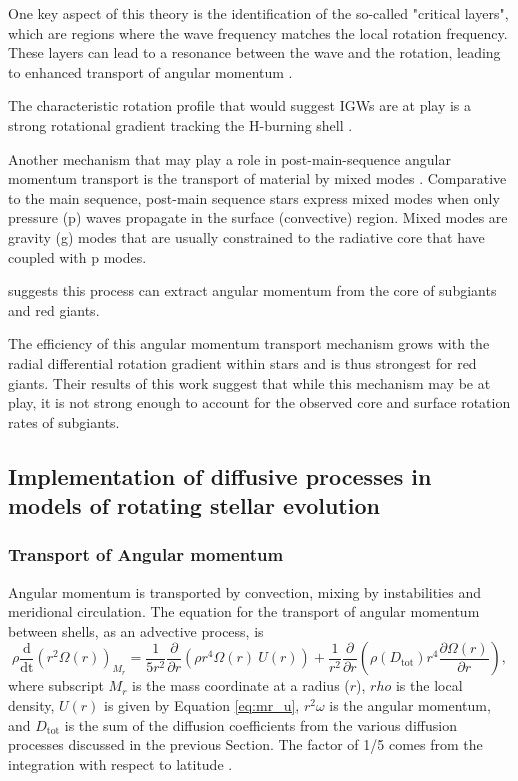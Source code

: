 One key aspect of this theory is the identification of the so-called "critical layers", which are regions where the wave frequency matches the local rotation frequency. These layers can lead to a resonance between the wave and the rotation, leading to enhanced transport of angular momentum \citep{charbonnel_influence_2005}.

The characteristic rotation profile that would suggest IGWs are at play is a strong rotational gradient tracking the H-burning shell \citep{balbus_stability_1994, menou_magnetorotational_2006}.

Another mechanism that may play a role in post-main-sequence angular momentum transport is the transport of material by mixed modes \citep{belkacem_angular_2015}.
Comparative to the main sequence, post-main sequence stars express mixed modes when only pressure (p) waves propagate in the surface (convective) region.
Mixed modes are gravity (g) modes that are usually constrained to the radiative core that have coupled with p modes.

\citet{belkacem_angular_2015} suggests this process can extract angular momentum from the core of subgiants and red giants.

The efficiency of this angular momentum transport mechanism grows with the radial differential rotation gradient within stars and is thus strongest for red giants.
Their results of this work suggest that while this mechanism may be at play, it is not strong enough to account for the observed core and surface rotation rates of subgiants.

\subsection{Implementation of diffusive processes in models of rotating stellar evolution}

\subsubsection{Transport of Angular momentum}

Angular momentum is transported by convection, mixing by instabilities and meridional circulation.
The equation for the transport of angular momentum between shells, as an advective process, is
\begin{equation}
    \rho \frac{\text{d}}{\text{dt}}\left(r^2 \Omega \left( r \right)\right)_{M_r} = \frac{1}{5r^2}\frac{\partial}{\partial r}\left(\rho r^4 \Omega \left( r \right)
 \ U\left(r\right)\right) + \frac{1}{r^2}\frac{\partial}{\partial r} \left(\rho \left( D_{\text{tot}}\right) r^4 \frac{\partial \Omega\left( r \right)}{\partial r}\right),
 \label{eq:amt}
\end{equation}
where subscript $M_r$ is the mass coordinate at a radius ($r$), $rho$ is the local density, $U(r)$ is given by Equation \ref{eq:mr_u}, $r^2\omega$ is the angular momentum, and $D_{\text{tot}}$ is the sum of the diffusion coefficients from the various diffusion processes discussed in the previous Section. The factor of 1/5 comes from the integration with respect to latitude \citep{zahn_circulation_1992,maeder_stellar_1998,maeder_evolution_2000,eggenberger_geneva_2008}.

